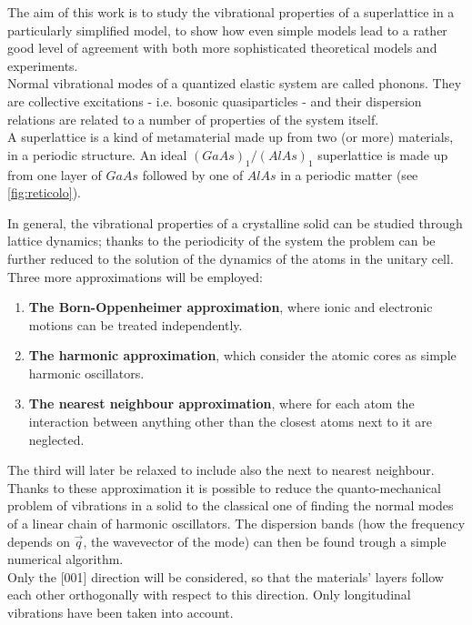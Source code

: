 \documentclass{article}
\begin{document}
The aim of this work is to study the vibrational properties of a superlattice in a particularly simplified model, to show how even simple models lead to a rather good level of agreement with both more sophisticated theoretical models and experiments.\\
Normal vibrational modes of a quantized elastic system are called phonons. They are collective excitations - i.e. bosonic quasiparticles - and their dispersion relations are related to a number of properties of the system itself. \\
A superlattice is a kind of metamaterial made up from two (or more) materials, in a periodic structure. An ideal $(GaAs)_1/(AlAs)_1$ superlattice is made up from one layer of $GaAs$ followed by one of $AlAs$ in a periodic matter (see \autoref{fig:reticolo}).\smallskip

In general, the vibrational properties of a crystalline solid can be studied through lattice dynamics; thanks to the periodicity of the system the problem can be further reduced to the solution of the dynamics of the atoms in the unitary cell.\\
	Three more approximations will be employed:
	\begin{enumerate}
		\item \textbf{The Born-Oppenheimer approximation}, where ionic and electronic motions can be treated independently.
		\item \textbf{The harmonic approximation}, which consider the atomic cores as simple harmonic oscillators.
		\item \textbf{The nearest neighbour approximation}, where for each atom the interaction between anything other than the closest atoms next to it are neglected.
	\end{enumerate}
	The third will later be relaxed to include also the next to nearest neighbour.\\
	Thanks to these approximation it is possible to reduce the quanto-mechanical problem of vibrations in a solid to the classical one of finding the normal modes of a linear chain of harmonic oscillators. The dispersion bands (how the frequency depends on $\vec{q}$, the wavevector of the mode) can then be found trough a simple numerical algorithm.\\
Only the [001] direction will be considered, so that the materials' layers follow each other orthogonally with respect to this direction. Only longitudinal vibrations have been taken into account. \\
\end{document}
